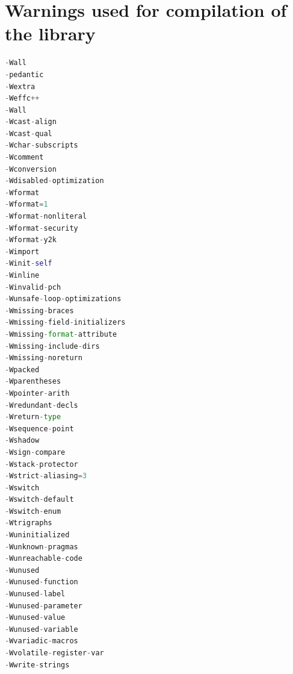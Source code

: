 \chapter{Warnings used for compilation of the library}
\label{appendix2}
\begin{lstlisting}[language=python]
-Wall
-pedantic
-Wextra
-Weffc++
-Wall
-Wcast-align
-Wcast-qual
-Wchar-subscripts
-Wcomment
-Wconversion
-Wdisabled-optimization
-Wformat
-Wformat=1
-Wformat-nonliteral
-Wformat-security
-Wformat-y2k
-Wimport
-Winit-self
-Winline
-Winvalid-pch
-Wunsafe-loop-optimizations
-Wmissing-braces
-Wmissing-field-initializers
-Wmissing-format-attribute
-Wmissing-include-dirs
-Wmissing-noreturn
-Wpacked
-Wparentheses
-Wpointer-arith
-Wredundant-decls
-Wreturn-type
-Wsequence-point
-Wshadow
-Wsign-compare
-Wstack-protector
-Wstrict-aliasing=3
-Wswitch
-Wswitch-default
-Wswitch-enum
-Wtrigraphs
-Wuninitialized
-Wunknown-pragmas
-Wunreachable-code
-Wunused
-Wunused-function
-Wunused-label
-Wunused-parameter
-Wunused-value
-Wunused-variable
-Wvariadic-macros
-Wvolatile-register-var
-Wwrite-strings
\end{lstlisting}


